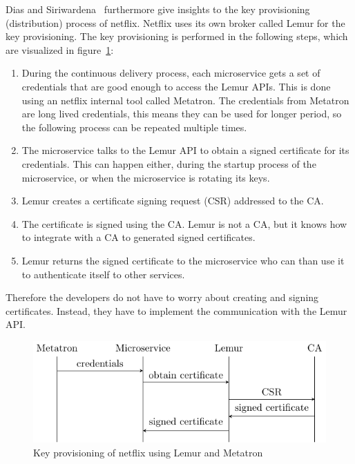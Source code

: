 Dias and Siriwardena~\cite{dias2020microservices} furthermore give insights to the key provisioning (distribution) process of netflix.
Netflix uses its own broker called Lemur for the key provisioning.
The key provisioning is performed in the following steps, which are visualized in figure~\ref{fig:key_provisioning_netflix}:
\begin{enumerate}
    \item During the continuous delivery process, each microservice gets a set of credentials that are good enough to access the Lemur APIs.
		This is done using an netflix internal tool called Metatron.
		The credentials from Metatron are long lived credentials, this means they can be used for longer period, so the following process can be repeated multiple times.
    \item The microservice talks to the Lemur API to obtain a signed certificate for its credentials.
		This can happen either, during the startup process of the microservice, or when the microservice is rotating its keys.
    \item Lemur creates a certificate signing request (CSR) addressed to the CA.
    \item The certificate is signed using the CA.
		Lemur is not a CA, but it knows how to integrate with a CA to generated signed certificates.
    \item Lemur returns the signed certificate to the microservice who can than use it to authenticate itself to other services.
\end{enumerate}
Therefore the developers do not have to worry about creating and signing certificates.
Instead, they have to implement the communication with the Lemur API.


\begin{figure}
	\centering
	\includegraphics{images/related-work/netflix-provisioning.pdf}
	\caption{Key provisioning of netflix using Lemur and Metatron~\cite{dias2020microservices}}
	\label{fig:key_provisioning_netflix}
\end{figure}

